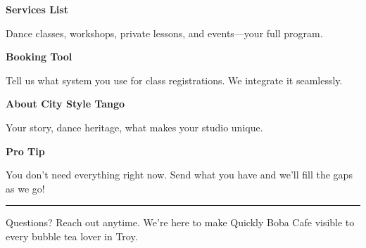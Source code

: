 \documentclass[11pt,letterpaper]{article}
\begin{document}
\hfill
\begin{minipage}[t]{0.48\textwidth}
\begin{tcolorbox}[colframe=accent-teal, boxrule=1pt, left=0.7em, right=0.7em, top=0.5em, bottom=0.5em, arc=4pt, boxsep=0pt]
{\bfseries\small\color{accent-teal}Services List}

\vspace{0.15em}

{\small Dance classes, workshops, private lessons, and events—your full program.}
\end{tcolorbox}

\vspace{0.1em}

\begin{tcolorbox}[colframe=accent-teal, boxrule=1pt, left=0.7em, right=0.7em, top=0.5em, bottom=0.5em, arc=4pt, boxsep=0pt]
{\bfseries\small\color{accent-teal}Booking Tool}

\vspace{0.15em}

{\small Tell us what system you use for class registrations. We integrate it seamlessly.}
\end{tcolorbox}

\vspace{0.1em}

\begin{tcolorbox}[colframe=accent-teal, boxrule=1pt, left=0.7em, right=0.7em, top=0.5em, bottom=0.5em, arc=4pt, boxsep=0pt]
{\bfseries\small\color{accent-teal}About City Style Tango}

\vspace{0.15em}

{\small Your story, dance heritage, what makes your studio unique.}
\end{tcolorbox}

\vspace{-0.2em}
\end{minipage}

\vspace{0.15em}

\begin{tcolorbox}[colback={accent-red!5}, colframe=accent-red!20, boxrule=0.5pt, left=0.7em, right=0.7em, top=0.4em, bottom=0.4em, arc=6pt, boxsep=0pt]

{\bfseries\small\color{accent-red}Pro Tip}

\vspace{0.1em}

{\small You don't need everything right now. Send what you have and we'll fill the gaps as we go!}

\end{tcolorbox}

\vspace{0.15em}

\noindent\hrule
\vspace{0.2em}

{\small\color{text-light}Questions? Reach out anytime. We're here to make Quickly Boba Cafe visible to every bubble tea lover in Troy.}
\end{document}
